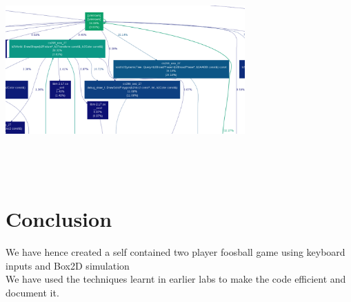 \documentclass{article}
\begin{document}
\includegraphics[width=260pt,height=200pt]{release1}\\\\
\section{Conclusion}
We have hence created a self contained two player foosball game using keyboard inputs and Box2D simulation\\
We have used the techniques learnt in earlier labs to make the code efficient and document it. \\



\end{document}
